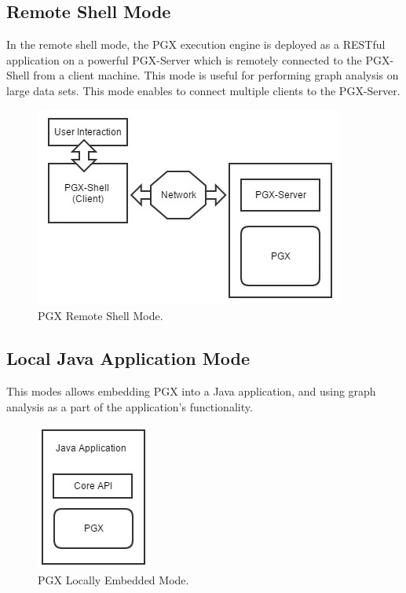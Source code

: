 \documentclass[9pt,twocolumn,twoside]{../../styles/osajnl}
\begin{document}
\subsection{Remote Shell Mode}
In the remote shell mode, the PGX execution engine is deployed as a
RESTful application on a powerful PGX-Server which is remotely
connected to the PGX-Shell from a client machine. This mode is useful
for performing graph analysis on large data sets. This mode enables to
connect multiple clients to the PGX-Server.
    \begin{figure}[h]
    \centering \includegraphics[scale=0.7]{images/3} \centering
    \caption{PGX Remote Shell Mode.}
    \end{figure}
    
\subsection{Local Java Application Mode}
This modes allows embedding PGX into a Java application, and using
graph analysis as a part of the application’s functionality.
    \begin{figure}[h]
    \centering \includegraphics[scale=0.6]{images/4} \centering
    \caption{PGX Locally Embedded Mode.}
    \end{figure}
    
\end{document}
